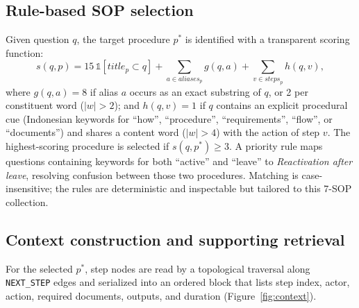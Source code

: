 \documentclass[preprint,10pt]{elsarticle}
\begin{document}
\subsection{Rule-based SOP selection}
Given question $q$, the target procedure $p^\ast$ is identified with a transparent scoring function:
\begin{equation}
s(q,p) = 15\,\mathbb{1}[\textit{title}_p \subset q] + \sum_{a \in \textit{aliases}_p} g(q,a) + \sum_{v \in \textit{steps}_p} h(q,v),
\label{eq:score}
\end{equation}
where $g(q,a)=8$ if alias $a$ occurs as an exact substring of $q$, or 2 per constituent word ($|w|>2$); and $h(q,v)=1$ if $q$ contains an explicit procedural cue (Indonesian keywords for ``how'', ``procedure'', ``requirements'', ``flow'', or ``documents'') and shares a content word ($|w|>4$) with the action of step $v$. The highest-scoring procedure is selected if $s(q,p^\ast)\geq 3$. A priority rule maps questions containing keywords for both ``active'' and ``leave'' to \emph{Reactivation after leave}, resolving confusion between those two procedures. Matching is case-insensitive; the rules are deterministic and inspectable but tailored to this 7-SOP collection.

\subsection{Context construction and supporting retrieval}
For the selected $p^\ast$, step nodes are read by a topological traversal along \texttt{NEXT\_STEP} edges and serialized into an ordered block that lists step index, actor, action, required documents, outputs, and duration (Figure~\ref{fig:context}).
\end{document}
